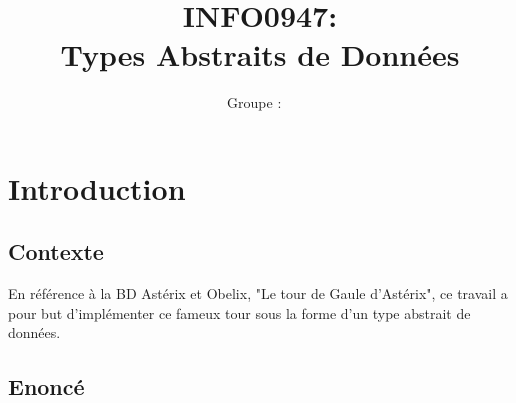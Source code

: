 \documentclass[a4paper, 11pt, oneside]{article}
\title{INFO0947: \intitule\\ Types Abstraits de Données}
\author{Groupe \GrNbr : \PrenomUN~\textsc{\NomUN}}
\date{}
\newcommand{\tablemat}{~}
\renewcommand{\tablemat}{\tableofcontents}
\begin{document}
\maketitle
\newpage
\tablemat
\newpage


\section{\textbf{Introduction}}

\subsection{\textbf{Contexte}}

En référence à la BD Astérix et Obelix, "Le tour de Gaule d'Astérix", ce travail a pour 
but d'implémenter ce fameux tour sous la forme d'un type abstrait de données.

\subsection{\textbf{Enoncé}}
\end{document}
